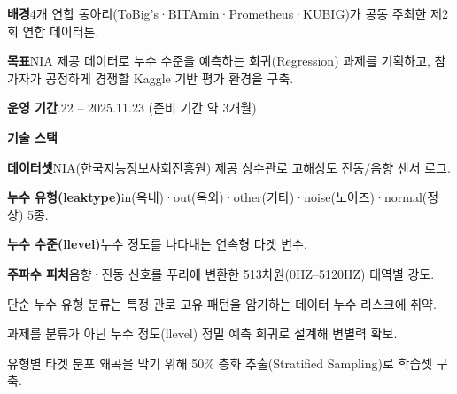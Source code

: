 

\begin{cvitems}
  \item {\textbf{배경}\enskip 4개 연합 동아리(ToBig's·BITAmin·Prometheus·KUBIG)가 공동 주최한 제2회 연합 데이터톤.}
  \item {\textbf{목표}\enskip NIA 제공 데이터로 누수 수준을 예측하는 회귀(Regression) 과제를 기획하고, 참가자가 공정하게 경쟁할 Kaggle 기반 평가 환경을 구축.}
  \item {\textbf{운영 기간}.22 -- 2025.11.23 (준비 기간 약 3개월)}
  \item {\textbf{기술 스택}\enskip {}    }
\end{cvitems}

\begin{cvitems}
  \item {\textbf{데이터셋}\enskip NIA(한국지능정보사회진흥원) 제공 상수관로 고해상도 진동/음향 센서 로그.}
  \item {\textbf{누수 유형(leaktype)}\enskip in(옥내)·out(옥외)·other(기타)·noise(노이즈)·normal(정상) 5종.}
  \item {\textbf{누수 수준(llevel)}\enskip 누수 정도를 나타내는 연속형 타겟 변수.}
  \item {\textbf{주파수 피처}\enskip 음향·진동 신호를 푸리에 변환한 513차원(0HZ--5120HZ) 대역별 강도.}
\end{cvitems}


\begin{substeps}
  \item 단순 누수 유형 분류는 특정 관로 고유 패턴을 암기하는 데이터 누수 리스크에 취약.
  \item 과제를 분류가 아닌 누수 정도(llevel) 정밀 예측 회귀로 설계해 변별력 확보.
  \item 유형별 타겟 분포 왜곡을 막기 위해 50\% 층화 추출(Stratified Sampling)로 학습셋 구축.
\end{substeps}

